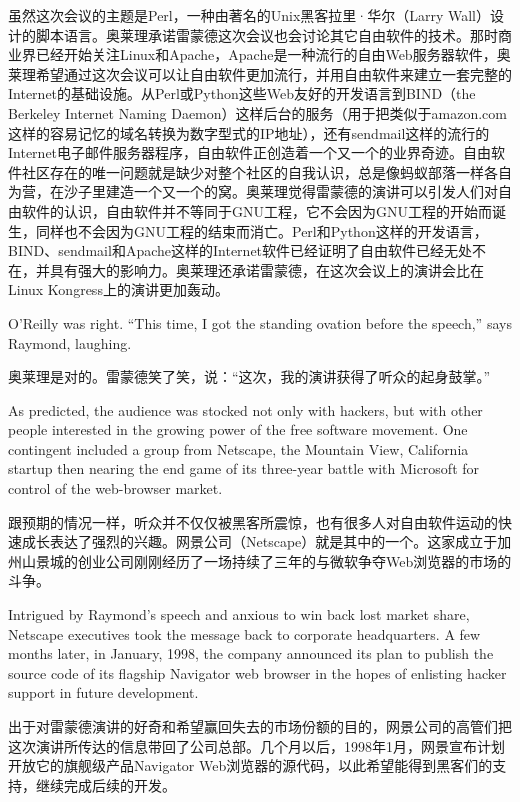 \ifdefined\chs
虽然这次会议的主题是Perl，一种由著名的Unix黑客拉里·华尔（Larry Wall）设计的脚本语言。奥莱理承诺雷蒙德这次会议也会讨论其它自由软件的技术。那时商业界已经开始关注Linux和Apache，Apache是一种流行的自由Web服务器软件，奥莱理希望通过这次会议可以让自由软件更加流行，并用自由软件来建立一套完整的Internet的基础设施。从Perl或Python这些Web友好的开发语言到BIND（the Berkeley Internet Naming Daemon）这样后台的服务（用于把类似于amazon.com这样的容易记忆的域名转换为数字型式的IP地址），还有sendmail这样的流行的Internet电子邮件服务器程序，自由软件正创造着一个又一个的业界奇迹。自由软件社区存在的唯一问题就是缺少对整个社区的自我认识，总是像蚂蚁部落一样各自为营，在沙子里建造一个又一个的窝。奥莱理觉得雷蒙德的演讲可以引发人们对自由软件的认识，自由软件并不等同于GNU工程，它不会因为GNU工程的开始而诞生，同样也不会因为GNU工程的结束而消亡。Perl和Python这样的开发语言，BIND、sendmail和Apache这样的Internet软件已经证明了自由软件已经无处不在，并具有强大的影响力。奥莱理还承诺雷蒙德，在这次会议上的演讲会比在Linux Kongress上的演讲更加轰动。
\fi

\ifdefined\eng
O'Reilly was right. ``This time, I got the standing ovation before the speech,'' says Raymond, laughing.
\fi

\ifdefined\chs
奥莱理是对的。雷蒙德笑了笑，说：``这次，我的演讲获得了听众的起身鼓掌。''
\fi

\ifdefined\eng
As predicted, the audience was stocked not only with hackers, but with other people interested in the growing power of the free software movement. One contingent included a group from Netscape, the Mountain View, California startup then nearing the end game of its three-year battle with Microsoft for control of the web-browser market.
\fi

\ifdefined\chs
跟预期的情况一样，听众并不仅仅被黑客所震惊，也有很多人对自由软件运动的快速成长表达了强烈的兴趣。网景公司（Netscape）就是其中的一个。这家成立于加州山景城的创业公司刚刚经历了一场持续了三年的与微软争夺Web浏览器的市场的斗争。
\fi

\ifdefined\eng
Intrigued by Raymond's speech and anxious to win back lost market share, Netscape executives took the message back to corporate headquarters. A few months later, in January, 1998, the company announced its plan to publish the source code of its flagship Navigator web browser in the hopes of enlisting hacker support in future development.
\fi

\ifdefined\chs
出于对雷蒙德演讲的好奇和希望赢回失去的市场份额的目的，网景公司的高管们把这次演讲所传达的信息带回了公司总部。几个月以后，1998年1月，网景宣布计划开放它的旗舰级产品Navigator Web浏览器的源代码，以此希望能得到黑客们的支持，继续完成后续的开发。
\fi

